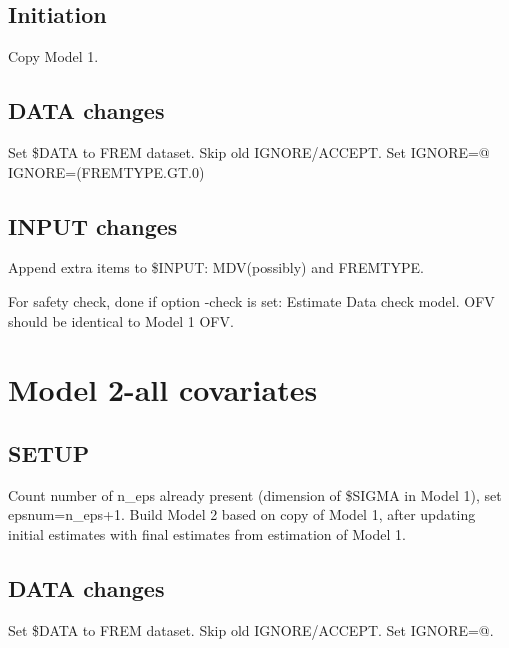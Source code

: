 \subsection{Initiation}
Copy Model 1.

\subsection{DATA changes}
Set \$DATA to FREM dataset. Skip old IGNORE/ACCEPT. Set IGNORE=@ IGNORE=(FREMTYPE.GT.0)

\subsection{INPUT changes}
Append extra items to \$INPUT: MDV(possibly) and FREMTYPE.

For safety check, done if option -check is set: Estimate Data check model. OFV should be identical to Model 1 OFV.


\section{Model 2-all covariates}



\subsection{SETUP}
Count number of n\_eps already present (dimension of \$SIGMA in Model 1), set epsnum=n\_eps+1.
Build Model 2 based on copy of Model 1, after updating initial estimates with final estimates
from estimation of Model 1.

\subsection{DATA changes}
Set \$DATA to FREM dataset. Skip old IGNORE/ACCEPT. Set IGNORE=@.

